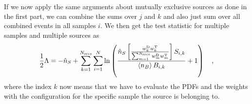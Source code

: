 If we now apply the same arguments about mutually exclusive sources as done in the first part, we can combine the sums over $j$ and $k$ and also just sum over all combined events in all samples $i$.
We then get the test statistic for multiple samples and multiple sources as
\begin{equation}
  \frac{1}{2}\Lambda
  = -\hat{n}_S + \sum_{k=1}^{N_\text{srcs}}\sum_{i=1}^{N} \ln\left(
        \frac{\hat{n}_S \left[
                \frac{ w_k^\text{D}w_k^\text{T} }
                     {\sum_{m=1}^{N_\text{srcs}} w^\text{D}_m w^\text{T}_m}
                \right] S_{i,k}}
             {\Braket{n_B} B_{i, k}} + 1 \right)
   \quad\text{,}
   \label{equ:multi_stack}
\end{equation}
where the index $k$ now means that we have to evaluate the PDFs and the weights with the configuration for the specific sample the source is belonging to.
